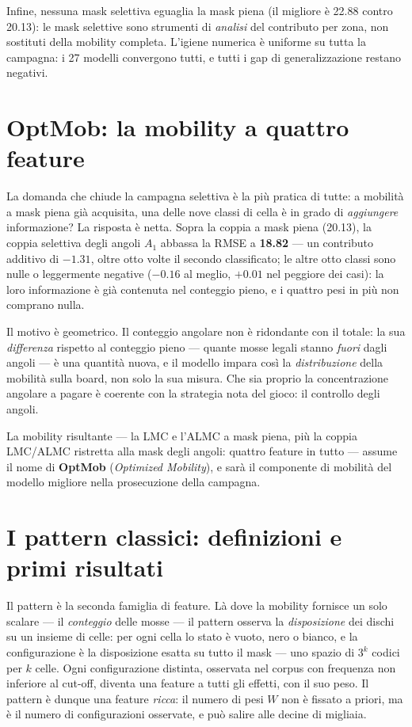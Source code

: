Infine, nessuna mask selettiva eguaglia la mask piena (il migliore è
22.88 contro 20.13): le mask selettive sono strumenti di
\emph{analisi} del contributo per zona, non sostituti della mobility
completa. L'igiene numerica è uniforme su tutta la campagna: i 27
modelli convergono tutti, e tutti i gap di generalizzazione restano
negativi.

\section{OptMob: la mobility a quattro feature}

La domanda che chiude la campagna selettiva è la più pratica di tutte:
a mobilità a mask piena già acquisita, una delle nove classi di cella
è in grado di \emph{aggiungere} informazione? La risposta è netta. Sopra la coppia a mask
piena (20.13), la coppia selettiva degli angoli $A_1$ abbassa la RMSE
a \textbf{18.82} — un contributo additivo di $-1.31$, oltre otto volte
il secondo classificato; le altre otto classi sono nulle o leggermente
negative ($-0.16$ al meglio, $+0.01$ nel peggiore dei casi): la loro
informazione è già contenuta nel conteggio pieno, e i quattro pesi in
più non comprano nulla.

Il motivo è geometrico. Il conteggio angolare non è ridondante con il
totale: la sua \emph{differenza} rispetto al conteggio pieno — quante
mosse legali stanno \emph{fuori} dagli angoli — è una quantità nuova,
e il modello impara così la \emph{distribuzione} della mobilità sulla
board, non solo la sua misura. Che sia proprio la concentrazione
angolare a pagare è coerente con la strategia nota del gioco: il
controllo degli angoli.

La mobility risultante — la LMC e l'ALMC a mask piena, più la coppia
LMC/ALMC ristretta alla mask degli angoli: quattro feature in tutto —
assume il nome di \textbf{OptMob} (\emph{Optimized Mobility}), e sarà
il componente di mobilità del modello migliore nella prosecuzione della
campagna.

\section{I pattern classici: definizioni e primi risultati}

Il pattern è la seconda famiglia di feature. Là dove la mobility
fornisce un solo scalare — il \emph{conteggio} delle mosse — il
pattern osserva la \emph{disposizione} dei dischi su un insieme di
celle: per ogni cella lo stato è vuoto, nero o bianco, e la
configurazione è la disposizione esatta su tutto il mask — uno spazio
di $3^k$ codici per $k$ celle. Ogni configurazione distinta,
osservata nel corpus con frequenza non inferiore al cut-off, diventa
una feature a tutti gli effetti, con il suo peso. Il pattern è dunque una feature \emph{ricca}: il numero di
pesi $W$ non è fissato a priori, ma è il numero di configurazioni
osservate, e può salire alle decine di migliaia.

